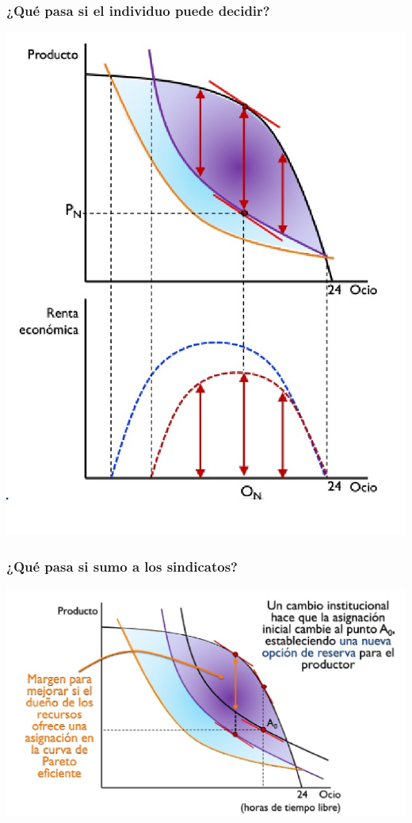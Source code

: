 \documentclass{beamer}
\begin{document}
\begin{frame}
\frametitle{ ¿Qué pasa si el individuo puede decidir?}
\centering
\includegraphics[scale=0.3]{Figures/Tema_04.11_modcap4_6.jpg}
\end{frame}

\begin{frame}
\frametitle{¿Qué pasa si sumo a los sindicatos?}
\centering
\includegraphics[scale=0.3]{Figures/Tema_04.13_modcap4_8.jpg}
\end{frame}
\end{document}
